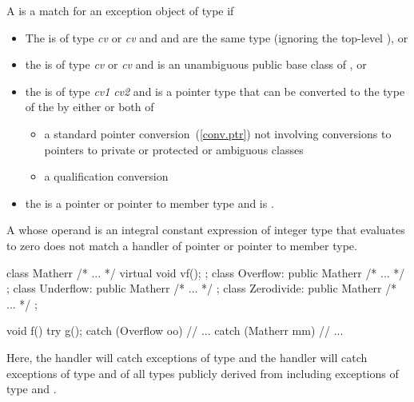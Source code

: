 \pnum
{}%
A
is a match for
an exception object
of type
if
\begin{itemize}
\item%
The
is of type
\textit{cv}
or
\textit{cv}
and
and
are the same type (ignoring the top-level
),
or
\item%
the
is of type
\textit{cv}
or
\textit{cv}
and
is an unambiguous public base class of
,
or
\item%
the
is of type
\textit{cv1}
\textit{cv2}
and
is a pointer type that can be
converted to the type of the
by either or both of
\begin{itemize}

\item%
a standard pointer conversion~(\ref{conv.ptr}) not involving conversions
to pointers to private or protected or ambiguous classes
\item%
a qualification conversion

\end{itemize}

\item
the  is a pointer or pointer to member type and  is .

\end{itemize}

\enternote
A
whose operand is an integral constant expression of integer type
that evaluates to zero does not match a handler of pointer or pointer to member type.
\exitnote

\enterexample
\begin{codeblock}
class Matherr { /* ... */ virtual void vf(); };
class Overflow: public Matherr { /* ... */ };
class Underflow: public Matherr { /* ... */ };
class Zerodivide: public Matherr { /* ... */ };

void f() {
  try {
    g();
  } catch (Overflow oo) {
        // ...
  } catch (Matherr mm) {
        // ...
  }
}
\end{codeblock}
Here, the
handler will catch exceptions of type
and the
handler will catch exceptions of type
and of all types publicly derived from
including exceptions of type
and
.
\exitexample

